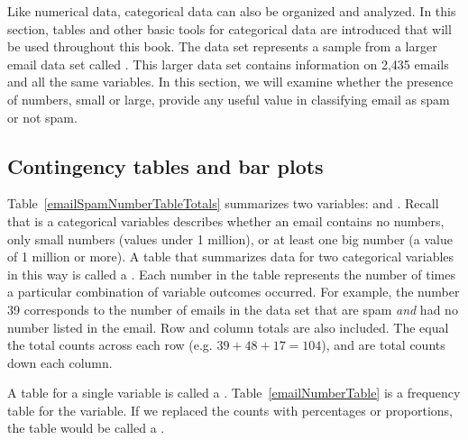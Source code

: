 
Like numerical data, categorical data can also be organized and analyzed. In this section, tables and other basic tools for categorical data are introduced that will be used throughout this book. The  data set represents a sample from a larger email data set called . This larger data set contains information on 2,435 emails and all the same variables. In this section, we will examine whether the presence of numbers, small or large, provide any useful value in classifying email as spam or not spam.


\subsection{Contingency tables and bar plots}


Table~\ref{emailSpamNumberTableTotals} summarizes two variables:  and . Recall that  is a categorical variables describes whether an email contains no numbers, only small numbers (values under 1 million), or at least one big number (a value of 1 million or more). A table that summarizes data for two categorical variables in this way is called a . Each number in the table represents the number of times a particular combination of variable outcomes occurred. For example, the number 39 corresponds to the number of emails in the data set that are spam \emph{and} had no number listed in the email. Row and column totals are also included. The  equal the total counts across each row (e.g. $39 + 48 + 17 = 104$), and  are total counts down each column.

A table for a single variable is called a . Table~\ref{emailNumberTable} is a frequency table for the  variable. If we replaced the counts with percentages or proportions, the table would be called a .

